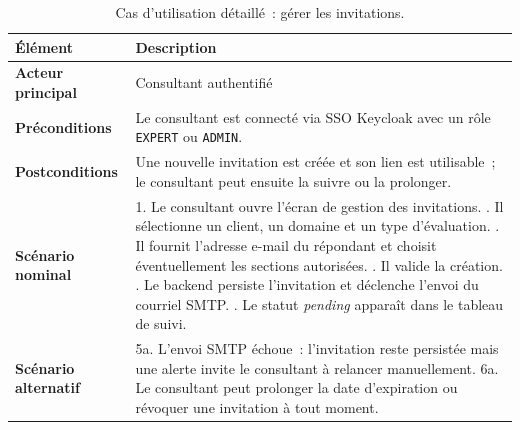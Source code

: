 \documentclass[12pt,a4paper]{report}
\begin{document}
\begin{table}[H]
\centering
\caption{Cas d'utilisation détaillé~: gérer les invitations.}
\begin{tabularx}{\textwidth}{>{\bfseries}L{3.5cm}Y}
\toprule
Élément & Description \\
\midrule
Acteur principal & Consultant authentifié \\
Préconditions & Le consultant est connecté via SSO Keycloak avec un rôle \texttt{EXPERT} ou \texttt{ADMIN}. \\
Postconditions & Une nouvelle invitation est créée et son lien est utilisable~; le consultant peut ensuite la suivre ou la prolonger. \\
Scénario nominal &
1. Le consultant ouvre l'écran de gestion des invitations. . Il sélectionne un client, un domaine et un type d'évaluation. . Il fournit l'adresse e-mail du répondant et choisit éventuellement les sections autorisées. . Il valide la création. . Le backend persiste l'invitation et déclenche l'envoi du courriel SMTP. . Le statut \textit{pending} apparaît dans le tableau de suivi. \\
Scénario alternatif &
5a. L'envoi SMTP échoue~: l'invitation reste persistée mais une alerte invite le consultant à relancer manuellement. \newline
6a. Le consultant peut prolonger la date d'expiration ou révoquer une invitation à tout moment. \\
\bottomrule
\end{tabularx}
\label{tab:uc-invite}
\end{table}
\end{document}
